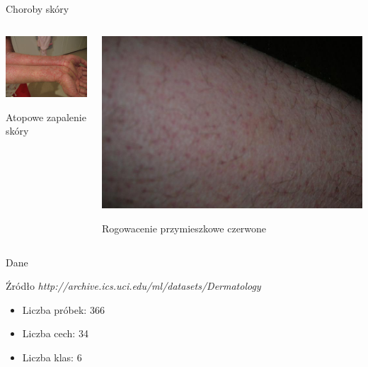 \documentclass{beamer}
\begin{document}
\begin{frame}{Choroby skóry}

\begin{columns}
\begin{column}{0.5\textwidth}
\begin{center}
  \includegraphics[scale=0.7]{img/chronic_dermatitis.jpg}

  Atopowe zapalenie skóry
\end{center}
\end{column}
\begin{column}{0.5\textwidth}
\begin{center}
  \includegraphics[scale=0.2]{img/pityriasis_rubra_pilaris.jpg}  

  Rogowacenie przymieszkowe czerwone
\end{center}
\end{column}
\end{columns}
\end{frame}

\begin{frame}{Dane}
\begin{block}{Źródło}
{\em http://archive.ics.uci.edu/ml/datasets/Dermatology}
\end{block}

\begin{itemize}
\item Liczba próbek: 366
\item Liczba cech: 34
\item Liczba klas: 6
\end{itemize}

\end{frame}
\end{document}
